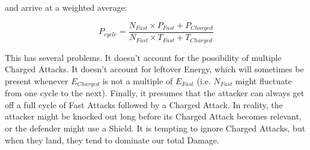 and arrive at a weighted average:

\[ P_{cycle} = \frac{N_{Fast} \times P_{Fast} + P_{Charged}}{N_{Fast} \times T_{Fast} + T_{Charged}} \]

This has several problems. It doesn't account for the possibility of multiple
Charged Attacks. It doesn't account for leftover Energy, which will sometimes
be present whenever $E_{Charged}$ is not a multiple of $E_{Fast}$ (i.e. $N_{Fast}$
might fluctuate from one cycle to the next). Finally, it presumes that the
attacker can always get off a full cycle of Fast Attacks followed by a Charged
Attack. In reality, the attacker might be knocked out long before its Charged
Attack becomes relevant, or the defender might use a Shield. It is tempting to
ignore Charged Attacks, but when they land, they tend to dominate our total
Damage.
